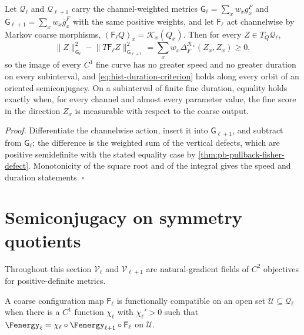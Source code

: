Let $\mathcal Q_\ell$ and $\mathcal Q_{\ell+1}$ carry the channel-weighted metrics
$\mathsf G_\ell=\sum_xw_xg^F_x$ and $\mathsf G_{\ell+1}=\sum_xw_x\bar g^F_x$ with the same
positive weights, and let $\mathsf F_\ell$ act channelwise by Markov coarse morphisms,
$(\mathsf F_\ell Q)_x=\mathscr K_x(Q_x)$.  Then for every $Z\in T_Q\mathcal Q_\ell$,
\begin{equation}
\lVert Z\rVert^2_{\mathsf G_\ell}
-\lVert T\mathsf F_\ell Z\rVert^2_{\mathsf G_{\ell+1}}
=\sum_xw_x\Delta_F^{\mathscr K_x}(Z_x,Z_x)
\geq0,
\label{eq:hist-pointwise-contraction-lift}
\end{equation}
so the image of every $C^1$ fine curve has no greater speed and no greater duration on
every subinterval, and \eqref{eq:hist-duration-criterion} holds along every orbit of an
oriented semiconjugacy. On a subinterval of finite fine duration, equality holds exactly
when, for every channel and almost every parameter value, the fine score in the
direction $Z_x$ is measurable with respect to the coarse output.

\noindent\emph{Proof.}
Differentiate the channelwise action, insert it into $\mathsf G_{\ell+1}$, and subtract
from $\mathsf G_\ell$; the difference is the weighted sum of the vertical defects, which
are positive semidefinite with the stated equality case by
\cref{thm:pb-pullback-fisher-defect}.  Monotonicity of the square root and of the
integral gives the speed and duration statements.  $\square$

\section{Semiconjugacy on symmetry quotients}
\label{sec:hist-natural-gradient-semiconjugacy}

Throughout this section $\mathscr V_\ell$ and $\mathscr V_{\ell+1}$ are natural-gradient
fields of $C^2$ objectives for positive-definite metrics.

A coarse configuration map $\mathsf F_\ell$ is functionally compatible on an open set
$\mathcal U\subseteq\mathcal Q_\ell$ when there is a $C^1$ function $\chi_\ell$ with
$\chi_\ell'>0$ such that $\Fenergy_\ell=\chi_\ell\circ\Fenergy_{\ell+1}\circ\mathsf
F_\ell$ on $\mathcal U$.

